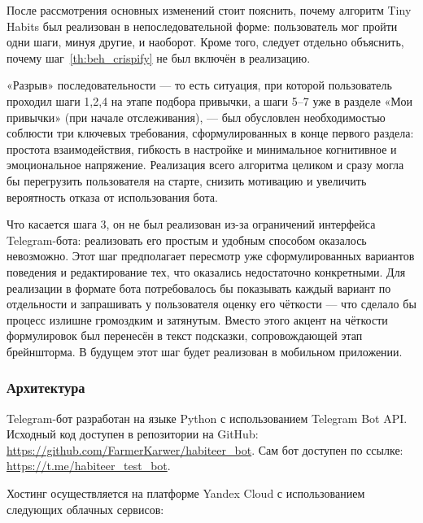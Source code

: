 \documentclass[pdflatex,sn-mathphys-num]{sn-jnl}%
\theoremstyle{thmstyleone}%
\theoremstyle{thmstyletwo}%
\theoremstyle{thmstylethree}%
\begin{document}
После рассмотрения основных изменений стоит пояснить, почему алгоритм Tiny Habits был реализован в непоследовательной форме: пользователь мог пройти одни шаги, минуя другие, и наоборот. Кроме того, следует отдельно объяснить, почему шаг~\ref{th:beh_crispify} не был включён в реализацию.

«Разрыв» последовательности — то есть ситуация, при которой пользователь проходил шаги 1,2,4 на этапе подбора привычки, а шаги 5–7 уже в разделе «Мои привычки» (при начале отслеживания), — был обусловлен необходимостью соблюсти три ключевых требования, сформулированных в конце первого раздела: простота взаимодействия, гибкость в настройке и минимальное когнитивное и эмоциональное напряжение. Реализация всего алгоритма целиком и сразу могла бы перегрузить пользователя на старте, снизить мотивацию и увеличить вероятность отказа от использования бота.

Что касается шага 3, он не был реализован из-за ограничений интерфейса Telegram-бота: реализовать его простым и удобным способом оказалось невозможно. Этот шаг предполагает пересмотр уже сформулированных вариантов поведения и редактирование тех, что оказались недостаточно конкретными. Для реализации в формате бота потребовалось бы показывать каждый вариант по отдельности и запрашивать у пользователя оценку его чёткости — что сделало бы процесс излишне громоздким и затянутым. Вместо этого акцент на чёткости формулировок был перенесён в текст подсказки, сопровождающей этап брейншторма. В будущем этот шаг будет реализован в мобильном приложении.

\subsubsection{Архитектура}

Telegram-бот разработан на языке Python с использованием Telegram Bot API. Исходный код доступен в репозитории на GitHub: \url{https://github.com/FarmerKarwer/habiteer_bot}. Сам бот доступен по ссылке: \url{https://t.me/habiteer_test_bot}.

Хостинг осуществляется на платформе Yandex Cloud с использованием следующих облачных сервисов:
\end{document}
